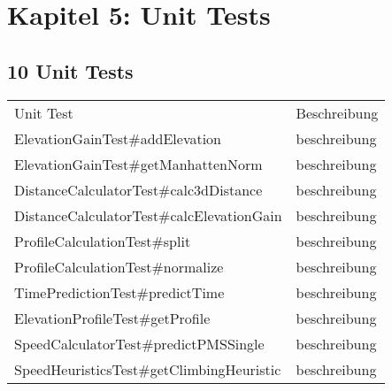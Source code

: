 \section{Kapitel 5: Unit Tests}

\subsection{10 Unit Tests}

\begin{tabular}[h]{ll}

Unit Test & Beschreibung \\
ElevationGainTest\#addElevation & beschreibung \\
ElevationGainTest\#getManhattenNorm & beschreibung \\
DistanceCalculatorTest\#calc3dDistance & beschreibung \\
DistanceCalculatorTest\#calcElevationGain & beschreibung \\
ProfileCalculationTest\#split & beschreibung \\
ProfileCalculationTest\#normalize & beschreibung \\
TimePredictionTest\#predictTime & beschreibung \\
ElevationProfileTest\#getProfile & beschreibung \\
SpeedCalculatorTest\#predictPMSSingle & beschreibung \\
SpeedHeuristicsTest\#getClimbingHeuristic & beschreibung \\

\end{tabular}